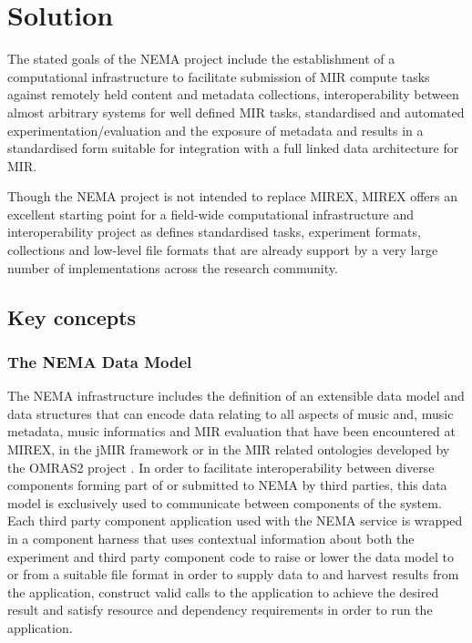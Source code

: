 \documentclass[conference]{IEEEtran}
\begin{document}
\section{Solution}
The stated goals of the NEMA project include the establishment of a computational infrastructure to facilitate submission of MIR compute tasks against remotely held content and metadata collections, interoperability between almost arbitrary systems for well defined MIR tasks, standardised and automated experimentation/evaluation and the exposure of metadata and results in a standardised form suitable for integration with a full linked data architecture for MIR. 
  
Though the NEMA project is not intended to replace MIREX, MIREX offers an excellent starting point for a field-wide computational infrastructure and interoperability project as defines standardised tasks, experiment formats, collections and low-level file formats that are already support by a very large number of implementations across the research community. 

\subsection{Key concepts}
\subsubsection{The NEMA Data Model}








The NEMA infrastructure includes the definition of an extensible data model and data structures that can encode data relating to all aspects of music and, music metadata, music informatics and MIR evaluation that have been encountered at MIREX, in the jMIR framework \cite{mckay2009jmir} or in the MIR related ontologies developed by the OMRAS2 project \cite{raimond2007music}. In order to facilitate interoperability between diverse components forming part of or submitted to NEMA by third parties, this data model is exclusively used to communicate between components of the system. 
Each third party component application used with the NEMA service is wrapped in a component harness that uses contextual information about both the experiment and third party component code to raise or lower the data model to or from a suitable file format in order to supply data to and harvest results from the application, construct valid calls to the application to achieve the desired result and satisfy resource and dependency requirements in order to run the application. 
\end{document}
